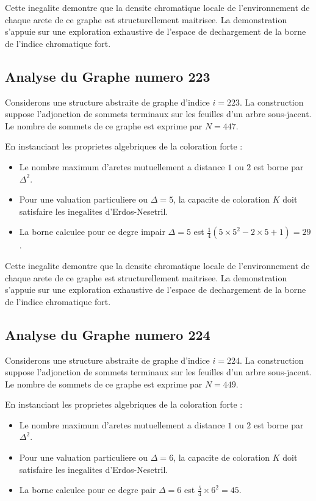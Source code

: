 \documentclass[11pt,a4paper]{article}
\begin{document}
Cette inegalite demontre que la densite chromatique locale de l'environnement de chaque arete de ce graphe est structurellement maitrisee. La demonstration s'appuie sur une exploration exhaustive de l'espace de dechargement de la borne de l'indice chromatique fort.

\subsection{Analyse du Graphe numero 223}
Considerons une structure abstraite de graphe d'indice $i = 223$. La construction suppose l'adjonction de sommets terminaux sur les feuilles d'un arbre sous-jacent. Le nombre de sommets de ce graphe est exprime par $N = 447$.

En instanciant les proprietes algebriques de la coloration forte :
\begin{itemize}
\item Le nombre maximum d'aretes mutuellement a distance $1$ ou $2$ est borne par $\Delta^2$.
\item Pour une valuation particuliere ou $\Delta = 5$, la capacite de coloration $K$ doit satisfaire les inegalites d'Erdos-Nesetril.
\item La borne calculee pour ce degre impair $\Delta = 5$ est $\frac{1}{4}(5 \times 5^2 - 2 \times 5 + 1) = 29$.
\end{itemize}

Cette inegalite demontre que la densite chromatique locale de l'environnement de chaque arete de ce graphe est structurellement maitrisee. La demonstration s'appuie sur une exploration exhaustive de l'espace de dechargement de la borne de l'indice chromatique fort.

\subsection{Analyse du Graphe numero 224}
Considerons une structure abstraite de graphe d'indice $i = 224$. La construction suppose l'adjonction de sommets terminaux sur les feuilles d'un arbre sous-jacent. Le nombre de sommets de ce graphe est exprime par $N = 449$.

En instanciant les proprietes algebriques de la coloration forte :
\begin{itemize}
\item Le nombre maximum d'aretes mutuellement a distance $1$ ou $2$ est borne par $\Delta^2$.
\item Pour une valuation particuliere ou $\Delta = 6$, la capacite de coloration $K$ doit satisfaire les inegalites d'Erdos-Nesetril.
\item La borne calculee pour ce degre pair $\Delta = 6$ est $\frac{5}{4} \times 6^2 = 45$.
\end{itemize}
\end{document}
